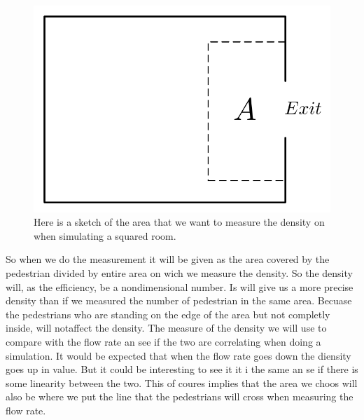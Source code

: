 \begin{figure}
\centering
\includegraphics[scale=.5]{Figures/SquareCase.pdf}
\caption{Here is a sketch of the area that we want to measure the density on when simulating a squared room.}
\label{fig:density}
\end{figure}

So when we do the measurement it will be given as the area covered by the pedestrian 
divided by entire area on wich we measure the density. So the density will, as the 
efficiency, be a nondimensional number. Is will give us a more precise density than 
if we measured the number of pedestrian in the same area.  Becuase the pedestrians 
who are standing on the edge of the area but not completly inside, will notaffect 
the density. The measure of the density we will use to compare with the flow rate 
an see if the two are correlating when doing a simulation. It would be expected 
that when the flow rate goes down the diensity goes up in value. But it could be 
interesting to see it it i the same an se if there is some linearity between the 
two. This of coures implies that the area we choos will also be where we put the 
line that the pedestrians will cross when measuring the flow rate.   